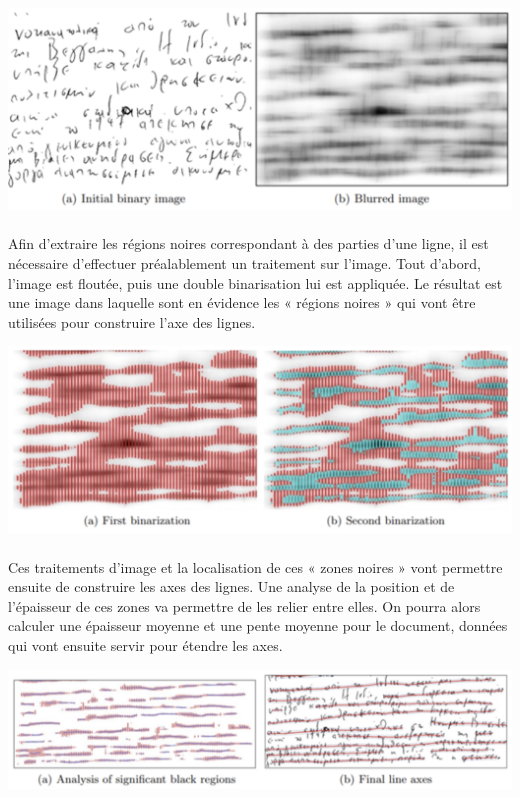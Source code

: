 \begin{mdframed}[innerbottommargin=10]
\begin{center}
\includegraphics[width=0.6\linewidth]{detect1.png}
\end{center}
\end{mdframed}

\paragraph{}
Afin d'extraire les régions noires correspondant à des parties d'une ligne, il est nécessaire d'effectuer préalablement un
traitement sur l'image. Tout d'abord, l'image est floutée, puis une double binarisation lui est appliquée. Le résultat est
une image dans laquelle sont en évidence les « régions noires » qui vont être utilisées pour construire l'axe des lignes.

\begin{mdframed}[innerbottommargin=10]
\begin{center}
\includegraphics[width=0.6\linewidth]{detect2.png}
\end{center}
\end{mdframed}

\paragraph{}
Ces traitements d'image et la localisation de ces « zones noires » vont permettre ensuite de construire les axes des lignes.
Une analyse de la position et de l'épaisseur de ces zones va permettre de les relier entre elles. On pourra alors calculer
une épaisseur moyenne et une pente moyenne pour le document, données qui vont ensuite servir pour étendre les axes.

\begin{mdframed}[innerbottommargin=10]
\begin{center}
\includegraphics[width=0.6\linewidth]{detect3.png}
\end{center}
\end{mdframed}

